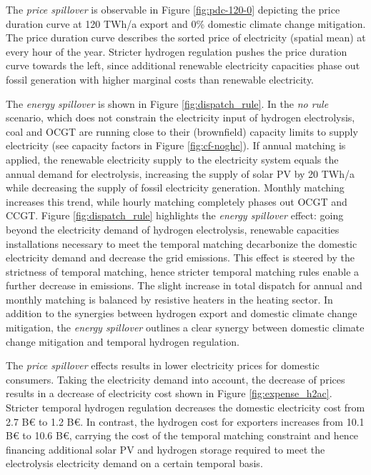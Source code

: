 The \textit{price spillover} is observable in Figure \ref{fig:pdc-120-0} depicting the price duration curve at 120 TWh/a export and 0\% domestic climate change mitigation. The price duration curve describes the sorted price of electricity (spatial mean) at every hour of the year.
Stricter hydrogen regulation pushes the price duration curve towards the left, since additional renewable electricity capacities phase out fossil generation with higher marginal costs than renewable electricity.


The \textit{energy spillover} is shown in Figure \ref{fig:dispatch_rule}. In the \textit{no rule} scenario, which does not constrain the electricity input of hydrogen electrolysis, coal and OCGT are running close to their (brownfield) capacity limits to supply electricity (see capacity factors in Figure \ref{fig:cf-noghc}). If annual matching is applied, the renewable electricity supply to the electricity system equals the annual demand for electrolysis, increasing the supply of solar PV by 20 TWh/a while decreasing the supply of fossil electricity generation. 
Monthly matching increases this trend, while hourly matching completely phases out OCGT and CCGT. Figure \ref{fig:dispatch_rule} highlights the \textit{energy spillover} effect: going beyond the electricity demand of hydrogen electrolysis, renewable capacities installations necessary to meet the temporal matching decarbonize the domestic electricity demand and decrease the grid emissions. This effect is steered by the strictness of temporal matching, hence stricter temporal matching rules enable a further decrease in emissions.
The slight increase in total dispatch for annual and monthly matching is balanced by resistive heaters in the heating sector.
In addition to the synergies between hydrogen export and domestic climate change mitigation, the \textit{energy spillover} outlines a clear synergy between domestic climate change mitigation and temporal hydrogen regulation.



The \textit{price spillover} effects results in lower electricity prices for domestic consumers. Taking the electricity demand into account, the decrease of prices results in a decrease of electricity cost shown in 
Figure \ref{fig:expense_h2ac}. Stricter temporal hydrogen regulation decreases the domestic electricity cost from 2.7 B€ to 1.2 B€. In contrast, the hydrogen cost for exporters increases from 10.1 B€ to 10.6 B€, carrying the cost of the temporal matching constraint and hence financing additional solar PV and hydrogen storage required to meet the electrolysis electricity demand on a certain temporal basis.

